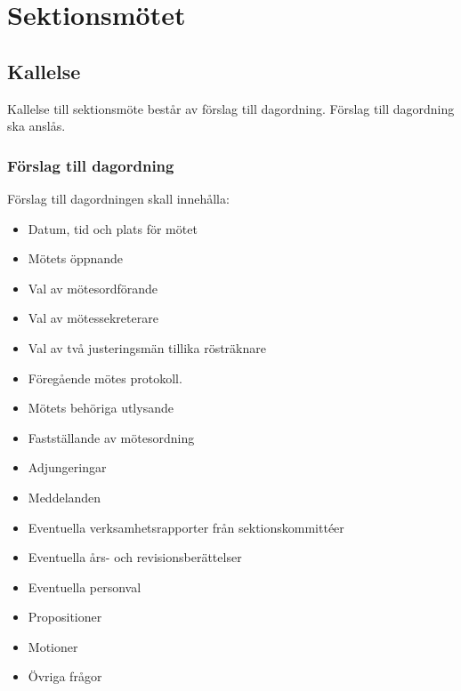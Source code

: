 \section{Sektionsmötet}

\subsection{Kallelse} 
Kallelse till sektionsmöte består av förslag till dagordning. Förslag till
dagordning ska anslås.

\subsubsection{Förslag till dagordning}
Förslag till dagordningen skall innehålla:
\begin{itemize}  
  \item Datum, tid och plats för mötet 
  \item Mötets öppnande 
  \item Val av mötesordförande 
  \item Val av mötessekreterare 
  \item Val av två justeringsmän tillika rösträknare 
  \item Föregående mötes protokoll. 
  \item Mötets behöriga utlysande 
  \item Fastställande av mötesordning 
  \item Adjungeringar 
  \item Meddelanden 
  \item Eventuella verksamhetsrapporter från sektionskommittéer 
  \item Eventuella års- och revisionsberättelser 
  \item Eventuella personval 
  \item Propositioner 
  \item Motioner 
  \item Övriga frågor 
\end{itemize}
